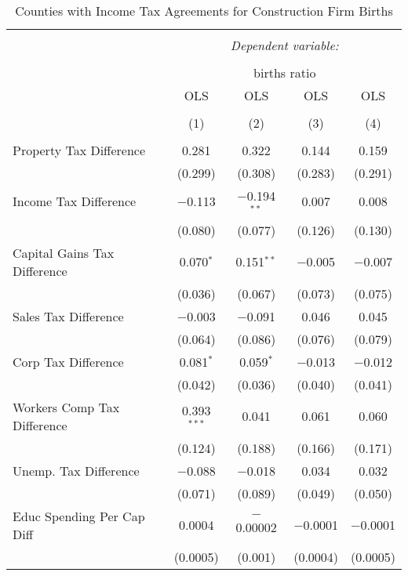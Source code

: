 
\begin{table}[!htbp] \centering 
  \caption{Counties with Income Tax Agreements for  Construction Firm Births} 
  \label{23rd} 
\begin{tabular}{@{\extracolsep{5pt}}lcccc} 
\\[-1.8ex]\hline 
\hline \\[-1.8ex] 
 & \multicolumn{4}{c}{\textit{Dependent variable:}} \\ 
\cline{2-5} 
\\[-1.8ex] & \multicolumn{4}{c}{births ratio} \\ 
 & OLS & OLS & OLS & OLS \\ 
\\[-1.8ex] & (1) & (2) & (3) & (4)\\ 
\hline \\[-1.8ex] 
 Property Tax Difference & 0.281 & 0.322 & 0.144 & 0.159 \\ 
  & (0.299) & (0.308) & (0.283) & (0.291) \\ 
  Income Tax Difference & $-$0.113 & $-$0.194$^{**}$ & 0.007 & 0.008 \\ 
  & (0.080) & (0.077) & (0.126) & (0.130) \\ 
  Capital Gains Tax Difference & 0.070$^{*}$ & 0.151$^{**}$ & $-$0.005 & $-$0.007 \\ 
  & (0.036) & (0.067) & (0.073) & (0.075) \\ 
  Sales Tax Difference & $-$0.003 & $-$0.091 & 0.046 & 0.045 \\ 
  & (0.064) & (0.086) & (0.076) & (0.079) \\ 
  Corp Tax Difference & 0.081$^{*}$ & 0.059$^{*}$ & $-$0.013 & $-$0.012 \\ 
  & (0.042) & (0.036) & (0.040) & (0.041) \\ 
  Workers Comp Tax Difference & 0.393$^{***}$ & 0.041 & 0.061 & 0.060 \\ 
  & (0.124) & (0.188) & (0.166) & (0.171) \\ 
  Unemp. Tax Difference & $-$0.088 & $-$0.018 & 0.034 & 0.032 \\ 
  & (0.071) & (0.089) & (0.049) & (0.050) \\ 
  Educ Spending Per Cap Diff & 0.0004 & $-$0.00002 & $-$0.0001 & $-$0.0001 \\ 
  & (0.0005) & (0.001) & (0.0004) & (0.0005) \\ 

\end{tabular}
\end{table}
